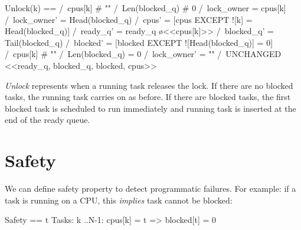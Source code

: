 \begin{tla}
Unlock(k) == 
    \/  /\ cpus[k] # "" 
        /\ Len(blocked_q) # 0
        /\ lock_owner = cpus[k]
        /\ lock_owner' = Head(blocked_q)
        /\ cpus' = [cpus EXCEPT ![k] = Head(blocked_q)]
        /\ ready_q' = ready_q \o <<cpus[k]>>
        /\ blocked_q' = Tail(blocked_q)
        /\ blocked' = [blocked EXCEPT ![Head(blocked_q)] = 0]
    \/  /\ cpus[k] # "" 
        /\ Len(blocked_q) = 0
        /\ lock_owner' = ""
        /\ UNCHANGED <<ready_q, blocked_q, blocked, cpus>>
\end{tla}
\begin{tlatex}
%
%
%
%
%
%
%
%
%
\end{tlatex}
\newline

\textit{Unlock} represents when a running task releases the lock. If there are
no blocked tasks, the running task carries on as before. If there are blocked
tasks, the first blocked task is scheduled to run immediately and running task
is inserted at the end of the ready queue. 

\section{Safety}

We can define safety property to detect programmatic failures. For example: if a
task is running on a CPU, this \textit{implies} task cannot be blocked:\newline

\begin{tla}
Safety ==
    \A t \in Tasks: 
        \A k ..N-1:
            cpus[k] = t => blocked[t] = 0 
\end{tla}
\begin{tlatex}
%
%
%
%
\end{tlatex}
\newline

